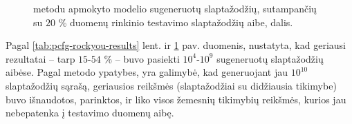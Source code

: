 \documentclass{VUMIFInfBakalaurinis}
\begin{document}
\begin{figure}[!ht]
  \begin{center}
  \end{center}
  \caption{%
     metodu apmokyto modelio sugeneruotų slaptažodžių, 
    sutampančių su $20$ \%  duomenų rinkinio testavimo
    slaptažodžių aibe, dalis.
  }
  \label{plot:pcfg-rockyou-results}
\end{figure}
Pagal \ref{tab:pcfg-rockyou-results} lent. ir \ref{plot:pcfg-rockyou-results} 
pav. duomenis, nustatyta, kad geriausi rezultatai -- tarp $15$-$54$ \% -- buvo 
pasiekti $10^4$-$10^9$ sugeneruotų slaptažodžių aibėse. Pagal  
metodo ypatybes, yra galimybė, kad generuojant jau $10^{10}$ slaptažodžių 
sąrašą, geriausios reikšmės (slaptažodžiai su didžiausia tikimybe) buvo 
išnaudotos, parinktos, ir liko visos žemesnių tikimybių reikšmės, kurios jau 
nebepatenka į testavimo duomenų aibę.
\end{document}
